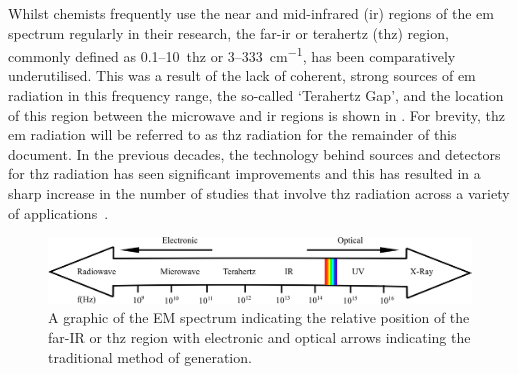 Whilst chemists frequently use the near and mid\nobreakdash-infrared (\acrshort{ir}) regions of the \acrfull{em} spectrum regularly in their research, the far\nobreakdash-\acrshort{ir} or terahertz (\acrshort{thz}) region, commonly defined as 0.1\nobreakdash--\SI{10}{\acrshort{thz}} or 3\nobreakdash--\SI{333}{cm^{-1}}, has been comparatively underutilised. This was a result of the lack of coherent, strong sources of \acrshort{em} radiation in this frequency range, the so\nobreakdash-called `Terahertz Gap', and the location of this region between the microwave and \acrshort{ir} regions is shown in . For brevity, \acrshort{thz} \acrshort{em} radiation will be referred to as \acrshort{thz} radiation for the remainder of this document. In the previous decades, the technology behind sources and detectors for \acrshort{thz} radiation has seen significant improvements and this has resulted in a sharp increase in the number of studies that involve \acrshort{thz} radiation across a variety of applications~\cite{Lewis2014}. 

\begin{figure}
    \centering
    \includegraphics[scale = 0.6]{Figures/Misc/Theory/EMSpectrum.png}
    \captionsetup{font = footnotesize, justification = centering}
    \caption[A Graphic of the Electromagnetic Spectrum]{A graphic of the EM spectrum indicating the relative position of the far-IR or \acrshort{thz} region with electronic and optical arrows indicating the traditional method of generation.}
    \label{fig:emspectrum}
\end{figure}

